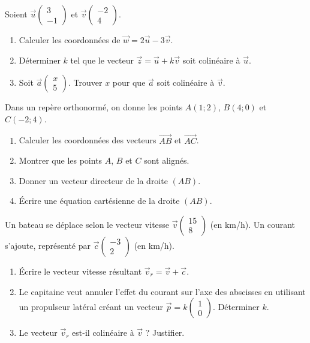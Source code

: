 \documentclass[11pt]{article}
\begin{document}
\begin{exercice}
Soient $\vec{u}\begin{pmatrix} 3 \\ -1 \end{pmatrix}$ et $\vec{v}\begin{pmatrix} -2 \\ 4 \end{pmatrix}$.
\begin{enumerate}
    \item Calculer les coordonnées de $\vec{w} = 2\vec{u} - 3\vec{v}$.
    \item Déterminer $k$ tel que le vecteur $\vec{z} = \vec{u} + k\vec{v}$ soit colinéaire à $\vec{u}$.
    \item Soit $\vec{a}\begin{pmatrix} x \\ 5 \end{pmatrix}$. Trouver $x$ pour que $\vec{a}$ soit colinéaire à $\vec{v}$.
\end{enumerate}
\end{exercice}

\begin{exercice}
Dans un repère orthonormé, on donne les points $A(1;2)$, $B(4;0)$ et $C(-2;4)$.
\begin{enumerate}
    \item Calculer les coordonnées des vecteurs $\vec{AB}$ et $\vec{AC}$.
    \item Montrer que les points $A$, $B$ et $C$ sont alignés.
    \item Donner un vecteur directeur de la droite $(AB)$.
    \item Écrire une équation cartésienne de la droite $(AB)$.
\end{enumerate}
\end{exercice}

\begin{exercice}
Un bateau se déplace selon le vecteur vitesse $\vec{v}\begin{pmatrix} 15 \\ 8 \end{pmatrix}$ (en km/h). Un courant s'ajoute, représenté par $\vec{c}\begin{pmatrix} -3 \\ 2 \end{pmatrix}$ (en km/h).
\begin{enumerate}
    \item Écrire le vecteur vitesse résultant $\vec{v}_r = \vec{v} + \vec{c}$.
    \item Le capitaine veut annuler l'effet du courant sur l'axe des abscisses en utilisant un propulseur latéral créant un vecteur $\vec{p} = k\begin{pmatrix} 1 \\ 0 \end{pmatrix}$. Déterminer $k$.
    \item Le vecteur $\vec{v}_r$ est-il colinéaire à $\vec{v}$ ? Justifier.
\end{enumerate}
\end{exercice}
\end{document}

